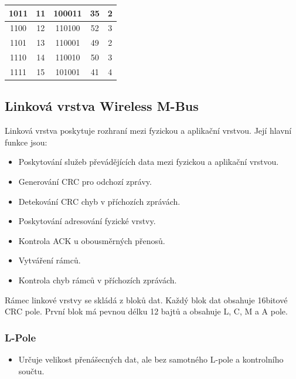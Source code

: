 \begin{table}[!ht]
\begin{tabular}{|c|c|c|c|c|}
1011             & 11                 & 100011              & 35                 & 2                          \\ \hline
1100             & 12                 & 110100              & 52                 & 3                          \\ \hline
1101             & 13                 & 110001              & 49                 & 2                          \\ \hline
1110             & 14                 & 110010              & 50                 & 3                          \\ \hline
1111             & 15                 & 101001              & 41                 & 4                          \\ \hline
\end{tabular}
\end{table}

\subsection{Linková vrstva Wireless M-Bus}

Linková vrstva poskytuje rozhraní mezi fyzickou a aplikační vrstvou. Její hlavní funkce jsou:
\begin{itemize}
	\item Poskytování služeb převádějících data mezi fyzickou a aplikační vrstvou.
	\item Generování CRC pro odchozí zprávy.
	\item Detekování CRC chyb v příchozích zprávách.
	\item Poskytování adresování fyzické vrstvy.
	\item Kontrola ACK u obousměrných přenosů.
	\item Vytváření rámců.
	\item Kontrola chyb rámců v příchozích zprávách.
\end{itemize}

Rámec linkové vrstvy se skládá z bloků dat. Každý blok dat obsahuje 16bitové CRC pole.  První blok má pevnou délku 12 bajtů a obsahuje L, C, M a A pole.

\subsubsection{L-Pole}
\begin{itemize}
	\item Určuje velikost přenášecných dat, ale bez samotného L-pole a kontrolního součtu.	
\end{itemize}

